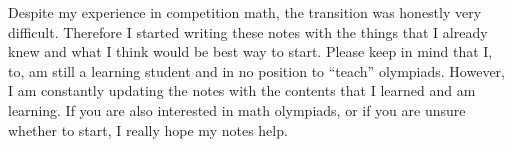\documentclass[../../../main.tex]{subfiles}
\begin{document}
Despite my experience in competition math, the transition was
honestly very difficult. Therefore I started writing these notes
with the things that I already knew and what I think would be best
way to start. Please keep in mind that I, to, am still a learning
student and in no position to ``teach'' olympiads. However,
I am constantly updating the notes with the contents that I learned
and am learning. If you are also interested in math olympiads,
or if you are unsure whether to start, I really hope my notes help.
\end{document}

